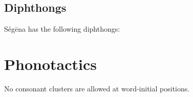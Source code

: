 \subsection{Diphthongs}

Ségēna has the following diphthongs:


\section{Phonotactics}

No consonant clusters are allowed at word-initial positions.
